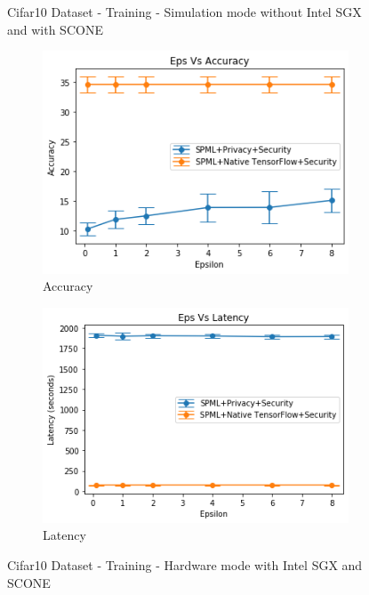 \begin{figure}
        \caption{Cifar10 Dataset - Training - Simulation mode without Intel SGX and with SCONE}
     \begin{subfigure}{0.5\textwidth}
         \includegraphics[width=\textwidth]{images/Training/Cifar10HWAccuracy.png}
         \caption{Accuracy}
         \label{fig:hwCifar10AccuracyTraining}
     \end{subfigure}
     \begin{subfigure}{0.5\textwidth}
         \includegraphics[width=\textwidth]{images/Training/Cifar10HWLatency.png}
         \caption{Latency}
         \label{fig:hwCifar10LatencyTraining}
     \end{subfigure}
        \caption{Cifar10 Dataset - Training - Hardware mode with Intel SGX and SCONE}
\end{figure}

